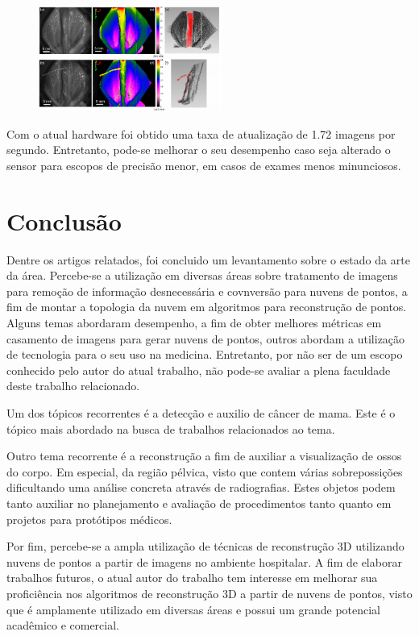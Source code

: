 \documentclass[letterpaper, 10 pt, conference]{ieeeconf}
\begin{document}
\begin{figure}[htb]
\label{fig:laparo_final}
\includegraphics[width=6cm]{./img/laparo_final.png}
\centering
\end{figure}


Com o atual hardware foi obtido uma taxa de atualização de 1.72 imagens por segundo.
%
Entretanto, pode-se melhorar o seu desempenho caso seja alterado o sensor para escopos de precisão menor, em casos de exames menos minunciosos.

\section{Conclusão}

Dentre os artigos relatados, foi concluido um levantamento sobre o estado da arte da área.
%
Percebe-se a utilização em diversas áreas sobre tratamento de imagens para remoção de informação desnecessária e covnversão para nuvens de pontos, a fim de montar a topologia da nuvem em algoritmos para reconstrução de pontos.
%
Alguns temas abordaram desempenho, a fim de obter melhores métricas em casamento de imagens para gerar nuvens de pontos, outros abordam a utilização de tecnologia para o seu uso na medicina.
%
Entretanto, por não ser de um escopo conhecido pelo autor do atual trabalho, não pode-se avaliar a plena faculdade deste trabalho relacionado.

Um dos tópicos recorrentes é a detecção e auxilio de câncer de mama.
%
Este é o tópico mais abordado na busca de trabalhos relacionados ao tema.

Outro tema recorrente é a reconstrução a fim de auxiliar a visualização de ossos do corpo.
%
Em especial, da região pélvica, visto que contem várias sobrepossições dificultando uma análise concreta através de radiografias.
%
Estes objetos podem tanto auxiliar no planejamento e avaliação de procedimentos tanto quanto em projetos para protótipos médicos.

Por fim, percebe-se a ampla utilização de técnicas de reconstrução 3D utilizando nuvens de pontos a partir de imagens no ambiente hospitalar.
%
A fim de elaborar trabalhos futuros, o atual autor do trabalho tem interesse em melhorar sua proficiência nos algoritmos de reconstrução 3D a partir de nuvens de pontos,
%
visto que é amplamente utilizado em diversas áreas e possui um grande potencial acadêmico e comercial.






\end{document}

